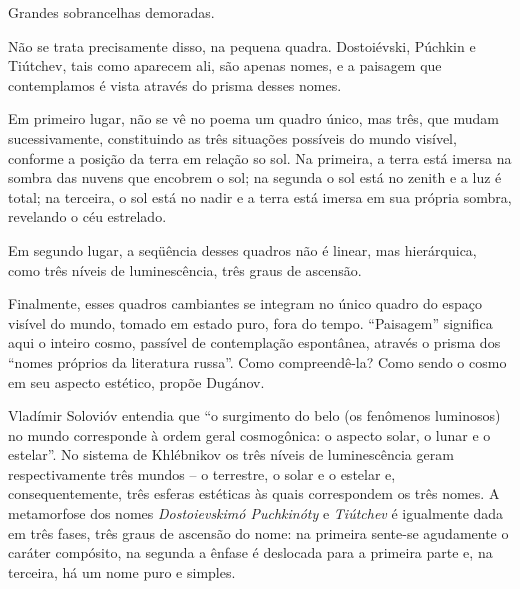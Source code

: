 Grandes sobrancelhas demoradas.

Não se trata precisamente disso, na pequena quadra. Dostoiévski, Púchkin
e Tiútchev, tais como aparecem ali, são apenas nomes, e a paisagem que
contemplamos é vista através do prisma desses nomes.

Em primeiro lugar, não se vê no poema um quadro único, mas três, que
mudam sucessivamente, constituindo as três situações possíveis do mundo
visível, conforme a posição da terra em relação so sol. Na primeira, a
terra está imersa na sombra das nuvens que encobrem o sol; na segunda o
sol está no zenith e a luz é total; na terceira, o sol está no nadir e a
terra está imersa em sua própria sombra, revelando o céu estrelado.

Em segundo lugar, a seqüência desses quadros não é linear, mas
hierárquica, como três níveis de luminescência, três graus de ascensão.

Finalmente, esses quadros cambiantes se integram no único quadro do
espaço visível do mundo, tomado em estado puro, fora do tempo.
``Paisagem'' significa aqui o inteiro cosmo, passível de contemplação
espontânea, através o prisma dos ``nomes próprios da literatura russa''.
Como compreendê-la? Como sendo o cosmo em seu aspecto estético, propõe
Dugánov.

Vladímir Solovióv entendia que ``o surgimento do belo (os fenômenos
luminosos) no mundo corresponde à ordem geral cosmogônica: o aspecto
solar, o lunar e o estelar''. No sistema de Khlébnikov os três níveis de
luminescência geram respectivamente três mundos -- o terrestre, o solar
e o estelar e, consequentemente, três esferas estéticas às quais
correspondem os três nomes. A metamorfose dos nomes \emph{Dostoievskimó
Puchkinóty} e \emph{Tiútchev} é igualmente dada em três fases, três
graus de ascensão do nome: na primeira sente-se agudamente o caráter
compósito, na segunda a ênfase é deslocada para a primeira parte e, na
terceira, há um nome puro e simples.

